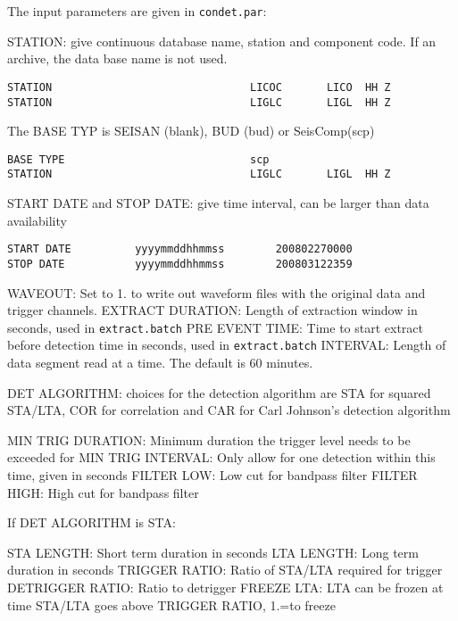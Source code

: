 The input parameters are given in \texttt{condet.par}: 

STATION: give continuous database name, station and component code. If an archive, the data base name is not used. 
\begin{verbatim}
STATION                               LICOC       LICO  HH Z 
STATION                               LIGLC       LIGL  HH Z 
\end{verbatim}

The BASE TYP is SEISAN (blank), BUD (bud) or SeisComp(scp)
\begin{verbatim}
BASE TYPE                             scp 
STATION                               LIGLC       LIGL  HH Z 
\end{verbatim}

START DATE and STOP DATE: give time interval, can be larger than data availability 
\begin{verbatim}
START DATE          yyyymmddhhmmss        200802270000 
STOP DATE           yyyymmddhhmmss        200803122359 
\end{verbatim}

WAVEOUT: Set to 1. to write out waveform files with the original data and trigger channels.\newline
EXTRACT DURATION: Length of extraction window in seconds, used in \texttt{extract.batch}\newline
PRE EVENT TIME: Time to start extract before detection time in seconds, used in \texttt{extract.batch}\newline
INTERVAL: Length of data segment read at a time. The default is 60 minutes. \newline

DET ALGORITHM: choices for the detection algorithm are STA for squared STA/LTA, COR for correlation and CAR for Carl Johnson's detection algorithm \newline

MIN TRIG DURATION: Minimum duration the trigger level needs to be exceeded for \newline
MIN TRIG INTERVAL: Only allow for one detection within this time, given in seconds \newline
FILTER LOW: Low cut for bandpass filter \newline
FILTER HIGH: High cut for bandpass filter 

If DET ALGORITHM is STA: 

STA LENGTH: Short term duration in seconds \newline
LTA LENGTH: Long term duration in seconds \newline
TRIGGER RATIO: Ratio of STA/LTA required for trigger \newline
DETRIGGER RATIO: Ratio to detrigger \newline
FREEZE LTA: LTA can be frozen at time STA/LTA goes above 
TRIGGER RATIO, 1.=to freeze 

